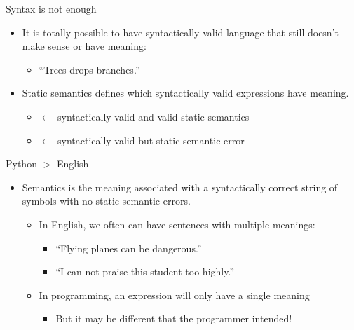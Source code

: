 \documentclass[pdf, aspectratio=169, 12pt]{beamer}
\begin{document}
\begin{frame}{Syntax is not enough}
	\begin{itemize}
		\item It is totally possible to have syntactically valid language that still doesn't make sense or have meaning:
			\begin{itemize}
				\item ``Trees drops branches.''
			\end{itemize}
		\item \alert{Static semantics} defines which syntactically valid expressions have meaning.
			\begin{itemize}
				\item {} $\leftarrow$ syntactically valid and valid static semantics
				\item {} $\leftarrow$ syntactically valid but static semantic error
			\end{itemize}
	\end{itemize}
\end{frame}

\begin{frame}{Python $>$ English}
	\begin{itemize}
		\item \alert{Semantics} is the meaning associated with a syntactically correct string of symbols with no static semantic errors.
			\begin{itemize}
				\item In English, we often can have sentences with multiple meanings:
					\begin{itemize}
						\item ``Flying planes can be dangerous.''
						\item ``I can not praise this student too highly.''
					\end{itemize}
				\item In programming, an expression will only have a single meaning
					\begin{itemize}
						\item But it may be different that the programmer intended!
					\end{itemize}
			\end{itemize}
	\end{itemize}
\end{frame}
\end{document}
